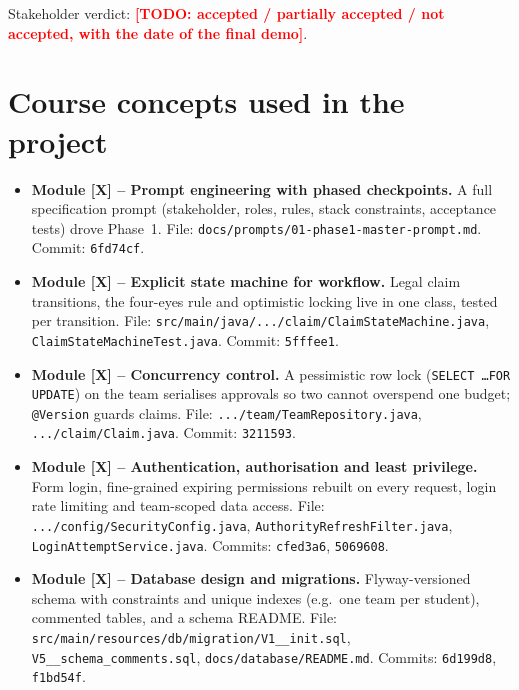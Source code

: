 \documentclass[11pt,a4paper]{article}
\newcommand{\todo}[1]{\textcolor{red}{\textbf{[TODO: #1]}}}
\begin{document}
Stakeholder verdict: \todo{accepted / partially accepted / not accepted, with the date of the final demo}.

\section{Course concepts used in the project}

\begin{itemize}[leftmargin=*,nosep]
    \item \textbf{Module [X] -- Prompt engineering with phased checkpoints.}
    A full specification prompt (stakeholder, roles, rules, stack constraints, acceptance tests) drove Phase~1.
    File: \texttt{docs/prompts/01-phase1-master-prompt.md}.
    Commit: \texttt{6fd74cf}.

    \item \textbf{Module [X] -- Explicit state machine for workflow.}
    Legal claim transitions, the four-eyes rule and optimistic locking live in one class, tested per transition.
    File: \texttt{src/main/java/.../claim/ClaimStateMachine.java}, \texttt{ClaimStateMachineTest.java}.
    Commit: \texttt{5fffee1}.

    \item \textbf{Module [X] -- Concurrency control.}
    A pessimistic row lock (\texttt{SELECT \ldots FOR UPDATE}) on the team serialises approvals so two cannot overspend one budget; \texttt{@Version} guards claims.
    File: \texttt{.../team/TeamRepository.java}, \texttt{.../claim/Claim.java}.
    Commit: \texttt{3211593}.

    \item \textbf{Module [X] -- Authentication, authorisation and least privilege.}
    Form login, fine-grained expiring permissions rebuilt on every request, login rate limiting and team-scoped data access.
    File: \texttt{.../config/SecurityConfig.java}, \texttt{AuthorityRefreshFilter.java}, \texttt{LoginAttemptService.java}.
    Commits: \texttt{cfed3a6}, \texttt{5069608}.

    \item \textbf{Module [X] -- Database design and migrations.}
    Flyway-versioned schema with constraints and unique indexes (e.g.\ one team per student), commented tables, and a schema README.
    File: \texttt{src/main/resources/db/migration/V1__init.sql}, \texttt{V5\_\_schema\_comments.sql}, \texttt{docs/database/README.md}.
    Commits: \texttt{6d199d8}, \texttt{f1bd54f}.


\end{itemize}
\end{document}
